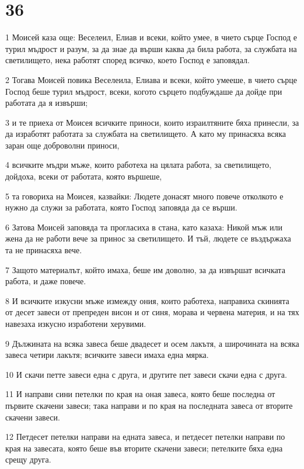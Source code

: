 \chapter{36}

\par 1 Моисей каза още: Веселеил, Елиав и всеки, който умее, в чието сърце Господ е турил мъдрост и разум, за да знае да върши каква да била работа, за службата на светилището, нека работят според всичко, което Господ е заповядал.
\par 2 Тогава Моисей повика Веселеила, Елиава и всеки, който умееше, в чието сърце Господ беше турил мъдрост, всеки, когото сърцето подбуждаше да дойде при работата да я извърши;
\par 3 и те приеха от Моисея всичките приноси, които израилтяните бяха принесли, за да изработят работата за службата на светилището. А като му принасяха всяка заран още доброволни приноси,
\par 4 всичките мъдри мъже, които работеха на цялата работа, за светилището, дойдоха, всеки от работата, която вършеше,
\par 5 та говориха на Моисея, казвайки: Людете донасят много повече отколкото е нужно да служи за работата, която Господ заповяда да се върши.
\par 6 Затова Моисей заповяда та прогласиха в стана, като казаха: Никой мъж или жена да не работи вече за принос за светилището. И тъй, людете се въздържаха та не принасяха вече.
\par 7 Защото материалът, който имаха, беше им доволно, за да извършат всичката работа, и даже повече.
\par 8 И всичките изкусни мъже измежду ония, които работеха, направиха скинията от десет завеси от препреден висон и от синя, морава и червена материя, и на тях навезаха изкусно изработени херувими.
\par 9 Дължината на всяка завеса беше двадесет и осем лакътя, а широчината на всяка завеса четири лакътя; всичките завеси имаха една мярка.
\par 10 И скачи петте завеси една с друга, и другите пет завеси скачи една с друга.
\par 11 И направи сини петелки по края на оная завеса, която беше последна от първите скачени завеси; така направи и по края на последната завеса от вторите скачени завеси.
\par 12 Петдесет петелки направи на едната завеса, и петдесет петелки направи по края на завесата, която беше във вторите скачени завеси; петелките бяха една срещу друга.
